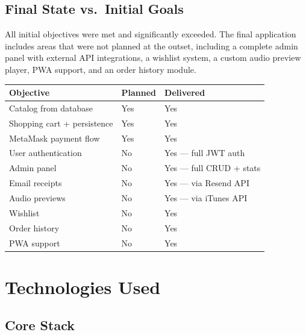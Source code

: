 \documentclass[11pt, a4paper]{report}
\begin{document}
\section{Final State vs.\ Initial Goals}

All initial objectives were met and significantly exceeded. The final application includes areas that were not planned at the outset, including a complete admin panel with external API integrations, a wishlist system, a custom audio preview player, PWA support, and an order history module.

\vspace{8pt}
\begin{tabularx}{\linewidth}{L{5.5cm} C{2.5cm} L{5.5cm}}
  \toprule
  \textbf{Objective} & \textbf{Planned} & \textbf{Delivered} \\
  \midrule
  Catalog from database       & Yes & Yes \\
  Shopping cart + persistence & Yes & Yes \\
  MetaMask payment flow       & Yes & Yes \\
  User authentication         & No  & Yes — full JWT auth \\
  Admin panel                 & No  & Yes — full CRUD + stats \\
  Email receipts              & No  & Yes — via Resend API \\
  Audio previews              & No  & Yes — via iTunes API \\
  Wishlist                    & No  & Yes \\
  Order history               & No  & Yes \\
  PWA support                 & No  & Yes \\
  \bottomrule
\end{tabularx}

\chapter{Technologies Used}

\section{Core Stack}
\end{document}
